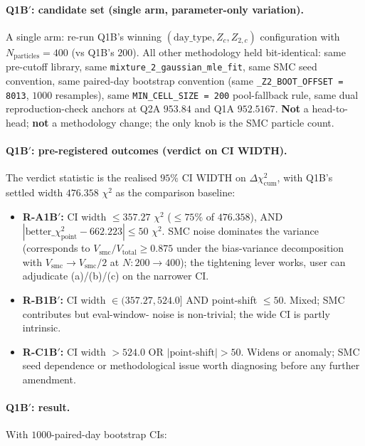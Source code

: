 \documentclass[11pt]{article}
\theoremstyle{definition}
\theoremstyle{plain}
\begin{document}
\paragraph{Q1B$'$: candidate set (single arm, parameter-only
variation).}
A single arm: re-run Q1B's winning $(\mathrm{day\_type}, Z_c,
Z_{2,c})$ configuration with $N_{\mathrm{particles}} = 400$ (vs
Q1B's $200$). All other methodology held bit-identical: same
pre-cutoff library, same \verb|mixture_2_gaussian_mle_fit|, same
SMC seed convention, same paired-day bootstrap convention (same
\verb|_Z2_BOOT_OFFSET = 8013|, $1000$ resamples), same
\verb|MIN_CELL_SIZE = 200| pool-fallback rule, same dual
reproduction-check anchors at Q2A $953.84$ and Q1A $952.5167$.
\textbf{Not} a head-to-head; \textbf{not} a methodology change;
the only knob is the SMC particle count.

\paragraph{Q1B$'$: pre-registered outcomes (verdict on CI WIDTH).}
The verdict statistic is the realised $95\%$ CI WIDTH on
$\Delta\chi^2_{\mathrm{cum}}$, with Q1B's settled width $476.358$
$\chi^2$ as the comparison baseline:
\begin{itemize}[leftmargin=2em]
\item \textbf{R-A1B$'$:} CI width $\le 357.27$ $\chi^2$
($\le 75\%$ of $476.358$), AND $|\mathrm{better}\_\chi^2_{\mathrm{point}}
- 662.223| \le 50$ $\chi^2$. SMC noise dominates the variance
(corresponds to $V_{\mathrm{smc}}/V_{\mathrm{total}} \ge 0.875$
under the bias-variance decomposition with
$V_{\mathrm{smc}} \to V_{\mathrm{smc}}/2$ at $N: 200 \to 400$);
the tightening lever works, user can adjudicate (a)/(b)/(c) on
the narrower CI.
\item \textbf{R-B1B$'$:} CI width $\in (357.27, 524.0]$ AND
point-shift $\le 50$. Mixed; SMC contributes but eval-window-
noise is non-trivial; the wide CI is partly intrinsic.
\item \textbf{R-C1B$'$:} CI width $> 524.0$ OR
$|\mathrm{point\text{-}shift}| > 50$. Widens or anomaly; SMC seed
dependence or methodological issue worth diagnosing before any
further amendment.
\end{itemize}

\paragraph{Q1B$'$: result.}
With $1000$-paired-day bootstrap CIs:
\end{document}
